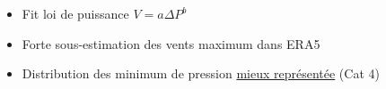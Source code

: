 \documentclass[aspectratio=169, usepdftitle=false, xcolor={dvipsnames}, 9pt,table]{beamer}
\begin{document}
\begin{frame}
\begin{columns}
\begin{column}{0.5\textwidth}
\begin{examples}[Méthodologie]
\begin{itemize}
                     \item Fit loi de puissance $V = a\Delta P^b$ \parencite{atkinson_tropical_1977}
                 \end{itemize}
             \end{examples}
             \vspace{2em}
             \begin{block}
                 \begin{itemize}
                     \item \alert{Forte sous-estimation} des vents maximum dans ERA5
                     \item Distribution des minimum de pression \underline{mieux représentée} (Cat 4)
                 \end{itemize}
             \end{block}
         \end{column}
     \end{columns} 
 \end{frame}
 
\end{document}
